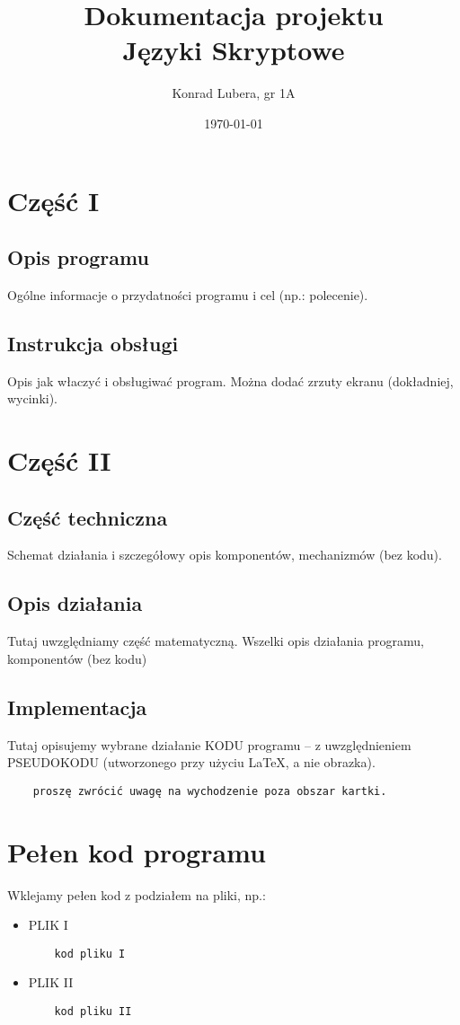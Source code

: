\documentclass[12pt,a4paper]{article}
\begin{document}
	
	\title{Dokumentacja projektu\\ Języki Skryptowe}
	\author{Konrad Lubera, gr 1A}
	\date{\today}
	
	\maketitle
	\newpage
	\section*{Część I}
	\subsection*{Opis programu}
	Ogólne informacje o przydatności programu i cel (np.: polecenie). 
	\subsection*{Instrukcja obsługi}
	Opis jak właczyć i obsługiwać program. Można dodać zrzuty ekranu (dokładniej, wycinki).
\newpage
	\section*{Część II}
	\subsection*{Część techniczna}
	Schemat działania i szczegółowy opis komponentów, mechanizmów (bez kodu).
	\subsection*{Opis działania} 
	Tutaj uwzględniamy część matematyczną. Wszelki opis działania programu, komponentów (bez kodu)
	\subsection*{Implementacja}
	Tutaj opisujemy wybrane działanie KODU programu -- z uwzględnieniem PSEUDOKODU (utworzonego przy użyciu \LaTeX, a nie obrazka).
	\begin{verbatim}
	proszę zwrócić uwagę na wychodzenie poza obszar kartki.
	\end{verbatim}
	\newpage
	\section*{Pełen kod programu}

	Wklejamy pełen kod z podziałem na pliki, np.:
	
	\begin{itemize}
	\item PLIK I
	\begin{verbatim}
	kod pliku I
	\end{verbatim}
	\item PLIK II
	\begin{verbatim}
	kod pliku II
	\end{verbatim}
	\end{itemize}
\end{document}
